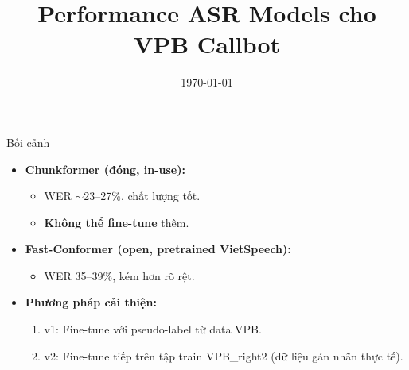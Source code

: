 \documentclass{beamer}
\title{Performance ASR Models cho VPB Callbot}
\author{}
\date{\today}
\begin{document}
\begin{frame}
    \titlepage
\end{frame}

\begin{frame}{Bối cảnh}
    \begin{itemize}
        \item \textbf{Chunkformer (đóng, in-use):} 
            \begin{itemize}
                \item WER $\sim$23--27\%, chất lượng tốt.
                \item \textbf{Không thể fine-tune} thêm.
            \end{itemize}
        \item \textbf{Fast-Conformer (open, pretrained VietSpeech):}
            \begin{itemize}
                \item WER 35--39\%, kém hơn rõ rệt.
            \end{itemize}
        \item \textbf{Phương pháp cải thiện:}
            \begin{enumerate}
                \item v1: Fine-tune với pseudo-label từ data VPB.
                \item v2: Fine-tune tiếp trên tập train VPB\_right2 (dữ liệu gán nhãn thực tế).
            \end{enumerate}
    \end{itemize}
\end{frame}
\end{document}
